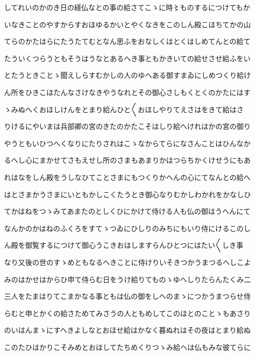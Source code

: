\documentclass[a4paper,11pt,landscape]{ltjtarticle}
\begin{document}
\par\medskip
してれいのかのき日の経仏なとの事の給さてこゝに時〻ものするにつけてもか
\par\medskip
いなきことのやすからすおほゆるかいとやくなきをこのしん殿こほちてかの山
\par\medskip
てらのかたはらにたうたてむとなん思ふをおなしくはとくはしめてんとの給て
\par\medskip
たういくつらうともそうはうなとあるへき事ともかきいての給せさせ給ふをい
\par\medskip
とたうときことゝ聞えしらすむかしの人のゆへある御すまゐにしめつくり給け
\par\medskip
ん所をひきこほたんなさけなきやうなれとその御心さしもくとくのかたにはす
\par\medskip
ゝみぬへくおほしけんをとまり給んひと〱おほしやりてえさはをきて給はさ
\par\medskip
りけるにやいまは兵部卿の宮のきたのかたこそはしり給へけれはかの宮の御り
\par\medskip
やうともいひつへくなりにたりされはこゝなからてらになさんことはひんなか
\par\medskip
るへし心にまかせてさもえせし所のさまもあまりかはつらちかくけせうにもあ
\par\medskip
れはなをしん殿をうしなひてことさまにもつくりかへんの心にてなんとの給へ
\par\medskip
はとさまかうさまにいともかしこくたうとき御心なりむかしわかれをかなしひ
\par\medskip
てかはねをつゝみてあまたのとしくひにかけて侍ける人も仏の御はうへんにて
\par\medskip
なんかのかはねのふくろをすてゝつゐにひしりのみちにもいり侍にけるこのし
\par\medskip
ん殿を御覧するにつけて御心うこきおはしますらんひとつにはたい〱しき事
\par\medskip
なり又後の世のすゝめともなるへきことに侍けりいそきつかうまつるへしこよ
\par\medskip
みのはかせはからひ申て侍らむ日をうけ給りてものゝゆへしりたらんたくみ二
\par\medskip
三人をたまはりてこまかなる事ともは仏の御をしへのまゝにつかうまつらせ侍
\par\medskip
らむと申とかくの給さためてみさうの人ともめしてこのほとのことゝもあさり
\par\medskip
のいはんまゝにすへきよしなとおほせ給はかなく暮ぬれはその夜はとまり給ぬ
\par\medskip
このたひはかりこそみめとおほしてたちめくりつゝみ給へは仏もみな彼てらに
\end{document}
